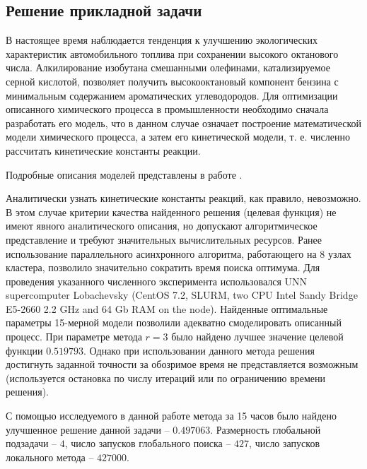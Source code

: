 \documentclass[11pt, oneside, a4paper]{article}
\begin{document}
\subsection{Решение прикладной задачи}

В настоящее время наблюдается тенденция к улучшению экологических характеристик автомобильного топлива при сохранении высокого октанового числа. Алкилирование изобутана смешанными олефинами, катализируемое серной кислотой, позволяет получить высокооктановый компонент бензина с минимальным содержанием ароматических углеводородов. Для оптимизации описанного химического процесса в промышленности необходимо сначала разработать его модель, что в данном случае означает построение математической модели химического процесса, а затем его кинетической модели, т. е. численно рассчитать кинетические константы реакции.

Подробные описания моделей представлены в работе \cite{KinModel2022}. 

Аналитически узнать кинетические константы реакций, как правило, невозможно. В этом случае критерии качества найденного решения (целевая функция) не имеют явного аналитического описания, но допускают алгоритмическое представление и требуют значительных вычислительных ресурсов. Ранее использование параллельного асинхронного алгоритма, работающего на 8 узлах кластера, позволило значительно сократить время поиска оптимума. Для проведения указанного численного эксперимента использовался UNN supercomputer Lobachevsky (CentOS 7.2, SLURM, two CPU Intel Sandy Bridge E5-2660 2.2 GHz and 64 Gb RAM on the node). Найденные оптимальные параметры 15-мерной модели позволили адекватно смоделировать описанный процесс. При параметре метода  $r = 3$ было найдено лучшее значение целевой функции $0.519793$. Однако при использовании данного метода решения достигнуть заданной точности за обозримое время не представляется возможным (используется остановка по числу итераций или по ограничению времени решения).

С помощью исследуемого в данной работе метода за 15 часов было найдено улучшенное решение данной задачи -- $0.497063$. Размерность глобальной подзадачи -- $4$, число запусков глобального поиска -- $427$, число запусков локального метода -- $427 000$.
\end{document}
